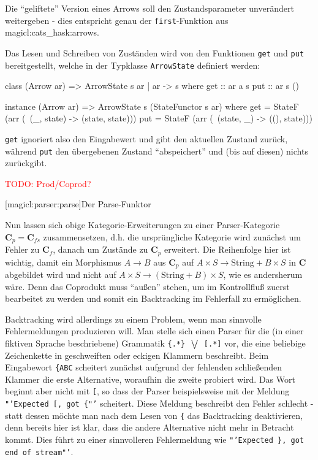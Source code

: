 \documentclass[a4paper, bibgerm]{book}
\newcommand\icode[1]{\lstinline?#1?}
\newcommand{\todo}[1]{
  \textcolor{red}{TODO: #1}
}
\newcommand\lsubsection{}
\newcommand\sref{}
\newcommand\ato{\rightarrow} %
\begin{document}
Die "`geliftete"' Version eines Arrows soll den Zustandsparameter
unverändert weitergeben - dies entspricht genau der
\icode{first}-Funktion aus \sref{magicl:cats_hask:arrows}.

Das Lesen und Schreiben von Zuständen wird von den Funktionen \icode{get} und
\icode{put} bereitgestellt, welche in der Typklasse \icode{ArrowState}
definiert werden:

\begin{code}
class (Arrow ar) => ArrowState s ar | ar -> s where
  get :: ar a s
  put :: ar s ()

instance (Arrow ar) => ArrowState s (StateFunctor s ar)
  where
    get = StateF (arr (\ (_, state) -> (state, state)))
    put = StateF (arr (\ (state, _) -> ((), state)))
\end{code}

\icode{get} ignoriert also den Eingabewert und gibt den aktuellen
Zustand zurück, während \icode{put} den übergebenen Zustand
"`abspeichert"' und (bis auf diesen) nichts zurückgibt.

\todo{Prod/Coprod?}

\lsubsection[magicl:parser:parse]{Der Parse-Funktor}

Nun lassen sich obige Kategorie-Erweiterungen zu einer Parser-Kategorie
$\mathbf{C}_p = \mathbf{C}_{fs}$ zusammensetzen, d.h. die ursprüngliche
Kategorie wird zunächst um Fehler zu $\mathbf{C}_f$, danach um Zustände
zu $\mathbf{C}_p$ erweitert. Die Reihenfolge hier ist wichtig, damit ein
Morphismus $A \ato B$ aus $\mathbf{C}_p$ auf $A \times S \ato
\mathrm{String} + B \times S$ in $\mathbf{C}$ abgebildet wird und nicht
auf $A \times S \ato (\mathrm{String} + B) \times S$, wie es andersherum
wäre. Denn das Coprodukt muss "`außen"' stehen, um im Kontrollfluß
zuerst bearbeitet zu werden und somit ein Backtracking im Fehlerfall zu
ermöglichen.

Backtracking wird allerdings zu einem Problem, wenn man sinnvolle
Fehlermeldungen produzieren will. Man stelle sich einen Parser für die
(in einer fiktiven Sprache beschriebene) Grammatik \texttt{\{.*\}
  $\bigvee$ [.*]} vor, die eine beliebige Zeichenkette in geschweiften
oder eckigen Klammern beschreibt. Beim Eingabewort \texttt{\{ABC}
scheitert zunächst aufgrund der fehlenden schließenden Klammer die erste
Alternative, woraufhin die zweite probiert wird. Das Wort beginnt aber
nicht mit \texttt{[}, so dass der Parser beispielsweise mit der Meldung
\texttt{"'Expected [, got \{"'} scheitert. Diese Meldung beschreibt den
Fehler schlecht - statt dessen möchte man nach dem Lesen von \texttt{\{}
das Backtracking deaktivieren, denn bereits hier ist klar, dass die
andere Alternative nicht mehr in Betracht kommt. Dies führt zu einer
sinnvolleren Fehlermeldung wie \texttt{"'Expected \}, got end of
  stream"'}.
\end{document}
